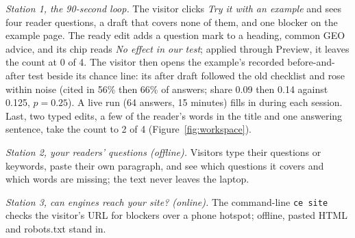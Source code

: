 \emph{Station 1, the 90-second loop.}
The visitor clicks \emph{Try it with an example} and sees four reader questions, a draft that covers none of them, and one blocker on the example page.
The ready edit adds a question mark to a heading, common GEO advice, and its chip reads \emph{No effect in our test}; applied through Preview, it leaves the count at 0 of 4.
The visitor then opens the example's recorded before-and-after test beside its chance line: its after draft followed the old checklist and rose within noise (cited in 56\% then 66\% of answers; share 0.09 then 0.14 against 0.125, $p = 0.25$).
A live run (64 answers, 15 minutes) fills in during each session.
Last, two typed edits, a few of the reader's words in the title and one answering sentence, take the count to 2 of 4 (Figure~\ref{fig:workspace}).

\emph{Station 2, your readers' questions (offline).}
Visitors type their questions or keywords, paste their own paragraph, and see which questions it covers and which words are missing; the text never leaves the laptop.

\emph{Station 3, can engines reach your site? (online).}
The command-line \texttt{ce site} checks the visitor's URL for blockers over a phone hotspot; offline, pasted HTML and robots.txt stand in.
